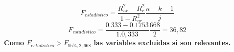 \documentclass[10pt,a4paper]{article}
\begin{document}
\begin{enumerate}
\textbf{
$$F_{estadistico} = \frac{R^2_{ur}-R^2_{r}}{1-R^2_{ur}}\frac{n-k-1}{j}$$
$$F_{estadistico} = \frac{0.333-0.1753}{1.0,333}\frac{668}{2}=36,82$$
Como $F_{estadistico}>F_{95\%,2,668}$ las variables excluidas si son relevantes.\\

}


\end{enumerate}

    
\end{document}
